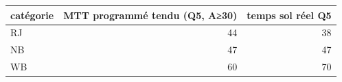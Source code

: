 \begin{tabular}{lrr}
\toprule
catégorie & MTT programmé tendu (Q5, A≥30) & temps sol réel Q5 \\
\midrule
RJ & 44 & 38 \\
NB & 47 & 47 \\
WB & 60 & 70 \\
\bottomrule
\end{tabular}
